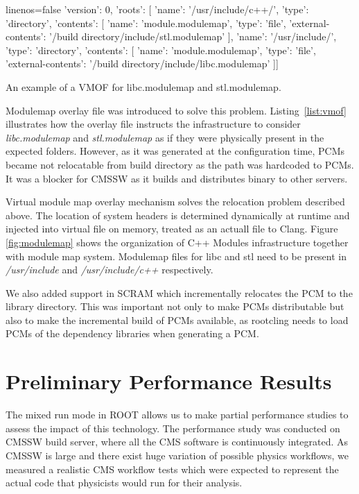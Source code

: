 \documentclass[12pt]{iopart}
\begin{document}
\begin{listing}[h]
\noindent
\begin{minipage}[h]{\textwidth}
\begin{cppcode*}{linenos=false}
{ 'version': 0,
  'roots': [
    { 'name': '/usr/include/c++/', 'type': 'directory',
      'contents': [
        { 'name': 'module.modulemap', 'type': 'file',
          'external-contents': '/build directory/include/stl.modulemap' }]},
    { 'name': '/usr/include/', 'type': 'directory',
      'contents': [
        { 'name': 'module.modulemap', 'type': 'file',
          'external-contents': '/build directory/include/libc.modulemap'
        }]}]}
\end{cppcode*}
\end{minipage}
\caption{An example of a VMOF for libc.modulemap and stl.modulemap.}
\label{list:vmof}
\end{listing}

Modulemap overlay file was introduced to solve this problem. Listing~\ref{list:vmof} illustrates how the overlay file instructs the infrastructure to consider \textit{libc.modulemap} and \textit{stl.modulemap} as if they were physically present in the expected folders. However, as it was generated at the configuration time, PCMs became not relocatable from build directory as the path was hardcoded to PCMs. It was a blocker for CMSSW as it builds and distributes binary to other servers.

Virtual module map overlay mechanism solves the relocation problem described above. The location of system headers is determined dynamically at runtime and injected into virtual file on memory, treated as an actuall file to Clang. Figure \ref{fig:modulemap} shows the organization of C++ Modules infrastructure together with module map system. Modulemap files for libc and stl need to be present in \textit{/usr/include} and \textit{/usr/include/c++} respectively. 

We also added support in SCRAM which incrementally relocates the PCM to the library directory. This was important not only to make PCMs distributable but also to make the incremental build of PCMs available, as rootcling needs to load PCMs of the dependency libraries when generating a PCM.

\section{Preliminary Performance Results}
\label{results}

The mixed run mode in ROOT allows us to make partial performance studies to assess the impact of this technology. The performance study was conducted on CMSSW build server, where all the CMS software is continuously integrated. As CMSSW is large and there exist huge variation of possible physics workflows, we measured a realistic CMS workflow tests which were expected to represent the actual code that physicists would run for their analysis.
\end{document}
